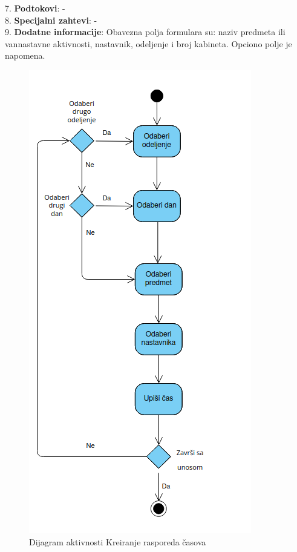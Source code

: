 \documentclass{article}
\begin{document}
7. \textbf{Podtokovi}: - \\

8. \textbf{Specijalni zahtevi}: - \\

9. \textbf{Dodatne informacije}: Obavezna polja formulara su: naziv predmeta ili vannastavne aktivnosti, nastavnik, odeljenje i broj kabineta. Opciono polje je napomena. \\


\begin{figure} [!ht]
    \begin{center}
        \includegraphics[scale=0.35]{imgs/Dijagram_aktivnosti_administrator_pravi_raspored_casova.png}
    \end{center}
\caption{Dijagram aktivnosti Kreiranje rasporeda časova}
\end{figure}
\end{document}
